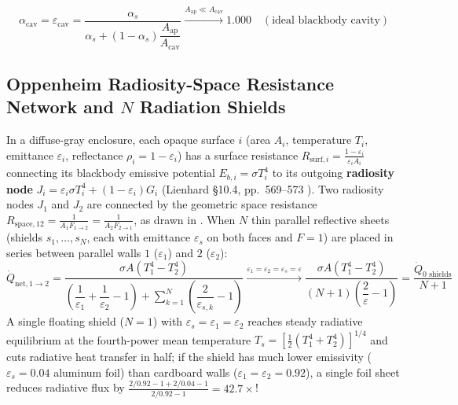 \begin{enumerate}
  \begin{equation}
    \boxed{\alpha_{\mathrm{cav}} = \varepsilon_{\mathrm{cav}} = \frac{\alpha_s}{\alpha_s + \left(1 - \alpha_s\right)\dfrac{A_{\mathrm{ap}}}{A_{\mathrm{cav}}}} \xrightarrow{A_{\mathrm{ap}} \ll A_{\mathrm{cav}}} 1.000 \quad (\text{ideal blackbody cavity})}
    \label{eq:12:cavity-hohlraum}
  \end{equation}
\end{enumerate}

\subsection{Oppenheim Radiosity-Space Resistance Network and $N$ Radiation Shields}
In a diffuse-gray enclosure, each opaque surface $i$ (area $A_i$, temperature $T_i$, emittance $\varepsilon_i$, reflectance $\rho_i = 1 - \varepsilon_i$) has a surface resistance $R_{\mathrm{surf},i} = \frac{1-\varepsilon_i}{\varepsilon_i A_i}$ connecting its blackbody emissive potential $E_{b,i} = \sigma T_i^4$ to its outgoing \textbf{radiosity node} $J_i = \varepsilon_i\sigma T_i^4 + (1-\varepsilon_i)G_i$ (Lienhard §10.4, pp.~569--573 ). Two radiosity nodes $J_1$ and $J_2$ are connected by the geometric space resistance $R_{\mathrm{space},12} = \frac{1}{A_1 F_{1\to 2}} = \frac{1}{A_2 F_{2\to 1}}$, as drawn in .
When $N$ thin parallel reflective sheets (shields $s_1, \dots, s_N$, each with emittance $\varepsilon_s$ on both faces and $F=1$) are placed in series between parallel walls $1$ ($\varepsilon_1$) and $2$ ($\varepsilon_2$):
\begin{equation}
  \dot{Q}_{\mathrm{net},1\to 2} = \frac{\sigma A\left(T_1^4 - T_2^4\right)}{\left(\dfrac{1}{\varepsilon_1} + \dfrac{1}{\varepsilon_2} - 1\right) + \sum_{k=1}^N \left(\dfrac{2}{\varepsilon_{s,k}} - 1\right)} \xrightarrow{\varepsilon_1=\varepsilon_2=\varepsilon_s=\varepsilon} \frac{\sigma A\left(T_1^4 - T_2^4\right)}{(N + 1)\left(\dfrac{2}{\varepsilon} - 1\right)} = \frac{\dot{Q}_{0\text{ shields}}}{N + 1}
  \label{eq:12:n-shields}
\end{equation}
A single floating shield ($N=1$) with $\varepsilon_s = \varepsilon_1 = \varepsilon_2$ reaches steady radiative equilibrium at the fourth-power mean temperature $T_s = \left[\frac{1}{2}(T_1^4 + T_2^4)\right]^{1/4}$ and cuts radiative heat transfer in half; if the shield has much lower emissivity ($\varepsilon_s = 0.04$ aluminum foil) than cardboard walls ($\varepsilon_1 = \varepsilon_2 = 0.92$), a single foil sheet reduces radiative flux by $\frac{2/0.92 - 1 + 2/0.04 - 1}{2/0.92 - 1} = \mathbf{42.7\times}$!


